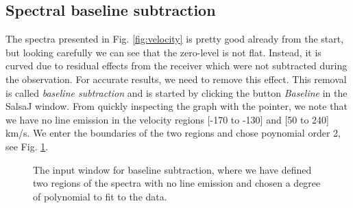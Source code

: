 \documentclass[11pt,a4paper]{article}
\begin{document}
\subsection{Spectral baseline subtraction}
The spectra presented in Fig. \ref{fig:velocity} is pretty good already from 
the start, but looking carefully we can see that the zero-level is not flat. 
Instead, it is curved due to residual effects from the receiver which were
not subtracted during the observation. 
For accurate results, we need to 
remove this effect. This removal is called \emph{baseline subtraction} and 
is started by clicking the button \emph{Baseline} in the SalsaJ window.
From quickly inspecting the graph 
with the pointer, we note that we have no line emission in the velocity regions
[-170 to -130] and [50 to 240] km/s. 
We enter the boundaries of the two regions and chose poynomial order 2, 
see Fig. \ref{fig:baseline}.

\begin{figure}[h!]
  \centering
  \caption{The input window for baseline subtraction, where we have defined
  two regions of the spectra with no line emission and chosen a degree of 
  polynomial to fit to the data.}
  \label{fig:baseline}
\end{figure}
\end{document}
